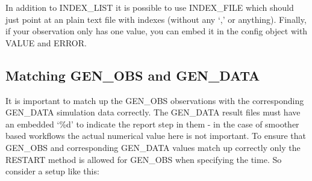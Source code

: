 \documentclass[a4paper,10pt,english]{sphinxmanual}
\begin{document}
In addition to INDEX\_LIST it is possible to use INDEX\_FILE which
should just point at an plain text file with indexes (without any ‘,’
or anything). Finally, if your observation only has one value, you can
embed it in the config object with VALUE and ERROR.


\subsection{Matching GEN\_OBS and GEN\_DATA}
\label{\detokenize{observations/index:matching-gen-obs-and-gen-data}}
It is important to match up the GEN\_OBS observations with the
corresponding GEN\_DATA simulation data correctly. The GEN\_DATA result
files must have an embedded ‘\%d’ to indicate the report step in them -
in the case of smoother based workflows the actual numerical value
here is not important. To ensure that GEN\_OBS and corresponding
GEN\_DATA values match up correctly only the RESTART method is allowed
for GEN\_OBS when specifying the time. So consider a setup like this:
\end{document}
